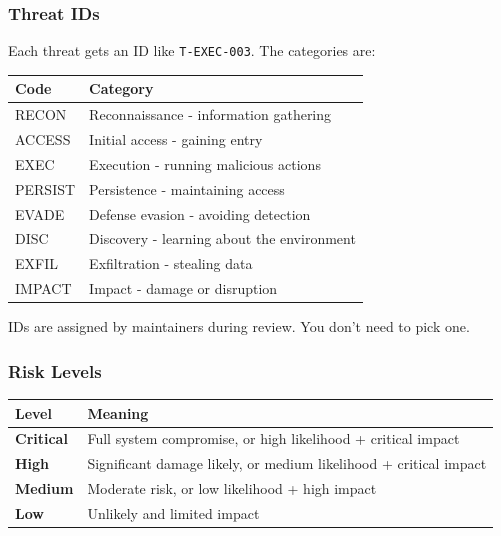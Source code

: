 \subsubsection{Threat IDs}


Each threat gets an ID like \texttt{T-EXEC-003}. The categories are:


\begin{table}[h]
\centering
\small
\begin{tabular}{|l|l|}
\hline
Code & Category \\
\hline
RECON & Reconnaissance - information gathering \\
\hline
ACCESS & Initial access - gaining entry \\
\hline
EXEC & Execution - running malicious actions \\
\hline
PERSIST & Persistence - maintaining access \\
\hline
EVADE & Defense evasion - avoiding detection \\
\hline
DISC & Discovery - learning about the environment \\
\hline
EXFIL & Exfiltration - stealing data \\
\hline
IMPACT & Impact - damage or disruption \\
\hline
\end{tabular}
\end{table}



IDs are assigned by maintainers during review. You don't need to pick one.

\subsubsection{Risk Levels}



\begin{table}[h]
\centering
\small
\begin{tabular}{|l|l|}
\hline
Level & Meaning \\
\hline
\textbf{Critical} & Full system compromise, or high likelihood + critical impact \\
\hline
\textbf{High} & Significant damage likely, or medium likelihood + critical impact \\
\hline
\textbf{Medium} & Moderate risk, or low likelihood + high impact \\
\hline
\textbf{Low} & Unlikely and limited impact \\
\hline
\end{tabular}
\end{table}



